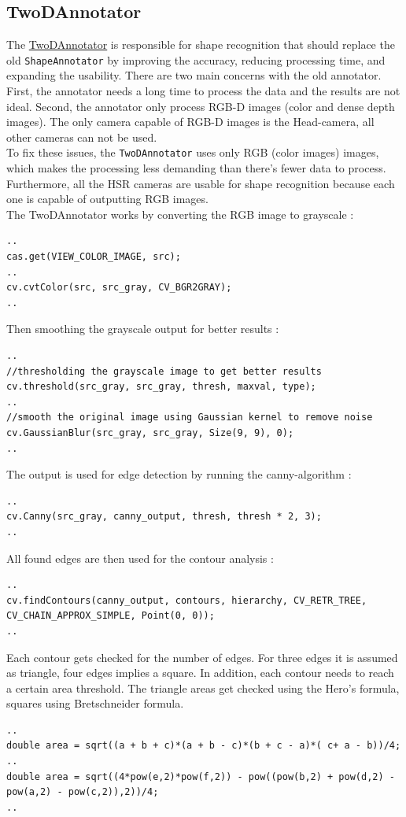 \documentclass[main.tex]{subfiles}
\begin{document}
				\subsection{TwoDAnnotator}
The \href{https://github.com/SUTURO/suturo_perception/blob/Handcamera_tracking/rs_Athene/src/TwoDAnnotator.cpp}{TwoDAnnotator} is responsible for shape recognition that should replace the old \texttt{ShapeAnnotator} by improving the accuracy, reducing processing time, and expanding the usability. 
There are two main concerns with the old annotator. First, the annotator needs a long time to process the data and the results are not ideal. Second, the annotator only process RGB-D images (color and dense depth images). The only camera capable of RGB-D images is the Head-camera, all other cameras can not be used. \\
To fix these issues, the \texttt{TwoDAnnotator} uses only RGB (color images) images, which makes the processing less demanding than there's fewer data to process. Furthermore, all the HSR cameras are usable for shape recognition because each one is capable of outputting RGB images. \\
The TwoDAnnotator works by converting the RGB image to grayscale :
\begin{lstlisting}
..
cas.get(VIEW_COLOR_IMAGE, src); 
..
cv.cvtColor(src, src_gray, CV_BGR2GRAY);
..
\end{lstlisting}
Then smoothing the grayscale output for better results : 
\begin{lstlisting}
..
//thresholding the grayscale image to get better results
cv.threshold(src_gray, src_gray, thresh, maxval, type);
..
//smooth the original image using Gaussian kernel to remove noise
cv.GaussianBlur(src_gray, src_gray, Size(9, 9), 0);
..
\end{lstlisting}
The output is used for edge detection by running the canny-algorithm : 
\begin{lstlisting}
..
cv.Canny(src_gray, canny_output, thresh, thresh * 2, 3);
..
\end{lstlisting}
All found edges are then used for the contour analysis : 
\begin{lstlisting}
..
cv.findContours(canny_output, contours, hierarchy, CV_RETR_TREE, CV_CHAIN_APPROX_SIMPLE, Point(0, 0));
..
\end{lstlisting}
Each contour gets checked for the number of edges. For three edges it is assumed as triangle, four edges implies a square. In addition, each contour needs to reach a certain area threshold. The triangle areas get checked using the Hero's formula, squares using Bretschneider formula. \\
\begin{lstlisting}
..
double area = sqrt((a + b + c)*(a + b - c)*(b + c - a)*( c+ a - b))/4;
..
double area = sqrt((4*pow(e,2)*pow(f,2)) - pow((pow(b,2) + pow(d,2) - pow(a,2) - pow(c,2)),2))/4;
..
\end{lstlisting}
\end{document}
